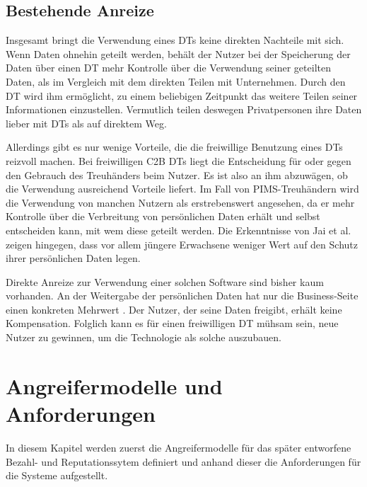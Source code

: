 \documentclass[
	fontsize=11pt,
	headings=small,
	parskip=half,           %
	bibliography=totoc,
	numbers=noenddot,       %
	open=any,               %
]{scrreprt}
\begin{document}
\section{Bestehende Anreize}
Insgesamt bringt die Verwendung eines DTs keine direkten Nachteile mit sich. Wenn Daten ohnehin geteilt werden, behält der Nutzer bei der Speicherung der Daten über einen DT mehr Kontrolle über die Verwendung seiner geteilten Daten, als im Vergleich mit dem direkten Teilen mit Unternehmen. Durch den DT wird ihm ermöglicht, zu einem beliebigen Zeitpunkt das weitere Teilen seiner Informationen einzustellen. Vermutlich teilen deswegen Privatpersonen ihre Daten lieber mit DTs als auf direktem Weg. \cite{dt-tresor24study}

Allerdings gibt es nur wenige Vorteile, die die freiwillige Benutzung eines DTs reizvoll machen. Bei freiwilligen C2B DTs liegt die Entscheidung für oder gegen den Gebrauch des Treuhänders beim Nutzer. Es ist also an ihm abzuwägen, ob die Verwendung ausreichend Vorteile liefert. Im Fall von PIMS-Treuhändern wird die Verwendung von manchen Nutzern als erstrebenswert angesehen, da er mehr Kontrolle über die Verbreitung von persönlichen Daten erhält und selbst entscheiden kann, mit wem diese geteilt werden. Die Erkenntnisse von Jai et al. \cite{dt-jai2016privacy} zeigen hingegen, dass vor allem jüngere Erwachsene weniger Wert auf den Schutz ihrer persönlichen Daten legen.

Direkte Anreize zur Verwendung einer solchen Software sind bisher kaum vorhanden. An der Weitergabe der persönlichen Daten hat nur die Business-Seite einen konkreten Mehrwert . Der Nutzer, der seine Daten freigibt, erhält keine Kompensation. Folglich kann es für einen freiwilligen DT mühsam sein, neue Nutzer zu gewinnen, um die Technologie als solche auszubauen.




\chapter{Angreifermodelle und Anforderungen}
In diesem Kapitel werden zuerst die Angreifermodelle für das später entworfene Bezahl- und Reputationssytem definiert und anhand dieser die Anforderungen für die Systeme aufgestellt.
\label{chap:req}
\end{document}
